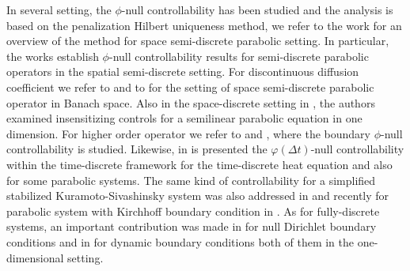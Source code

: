 \documentclass[11pt,oneside,leqno]{amsart}
\numberwithin{equation}{section}
\numberwithin{equation}{section}
\begin{document}
\par In several setting, the $\phi$-null controllability has been studied and the analysis is based on the penalization Hilbert uniqueness method, we refer to the work \cite{boyer-canum} for an overview of the method for space semi-discrete parabolic setting. In particular, the works \cite{boyer-2014,boyer-2010-1d-elliptic,BHLR:2010} establish $\phi$-null controllability results for semi-discrete parabolic operators in the spatial semi-discrete setting. For discontinuous diffusion coefficient we refer to \cite{Thuy} and to \cite{Thuy2} for the setting of space semi-discrete parabolic operator in Banach space. Also in the space-discrete setting in \cite{BHSDT:2019}, the authors examined insensitizing controls for a semilinear parabolic equation in one dimension. For higher order operator we refer to \cite{CLTP-2022} and \cite{kumar:hal-04828698}, where the boundary $\phi$-null controllability is studied. Likewise, in  \cite{BHS:2020} is presented the $\varphi(\Delta t)$-null controllability within the time-discrete framework for the time-discrete heat equation and also for some parabolic systems. The same kind of controllability for a simplified stabilized Kuramoto-Sivashinsky system was also addressed in \cite{HS:2023} and recently for parabolic system with Kirchhoff boundary condition in \cite{bhandari:hal-04597449}. As for fully-discrete systems, an important contribution was made in \cite{GC-HS-2021} for null Dirichlet boundary conditions and in \cite{LMPZ:2023} for dynamic boundary conditions both of them in the one-dimensional setting.
\end{document}
